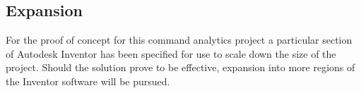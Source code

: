 \documentclass[onecolumn, draftclsnofoot,10pt, compsoc]{IEEEtran}
\begin{document}
\subsection{Expansion}
For the proof of concept for this command analytics project a particular section of Autodesk Inventor has been specified for use to scale down the size of the project. Should the solution prove to be effective, expansion into more regions of the Inventor software will be pursued.  


\end{document}
